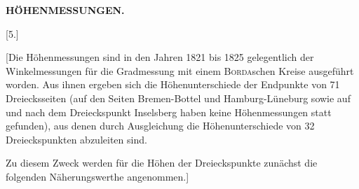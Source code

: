 \par\clearpage
\noindent\null\hfill{\small\textbf{HÖHENMESSUNGEN.}}\hfill{}\par\medskip
\begin{center}
[5.]\par{}
\end{center}
\par\noindent\hspace*{\parindent}[Die Höhenmessungen sind in den Jahren 1821 bis 1825 gelegentlich der
Winkelmessungen für die Gradmessung mit einem \textsc{Borda}schen Kreise ausgeführt worden.
Aus ihnen ergeben sich die Höhenunterschiede der Endpunkte von 71 Dreiecksseiten
(auf den Seiten Bremen-Bottel und Hamburg-Lüneburg sowie auf und nach dem Dreieckspunkt
Inselsberg haben keine Höhenmessungen statt gefunden), aus denen durch Ausgleichung
die Höhenunterschiede von 32 Dreieckspunkten abzuleiten sind.
\par\noindent\hspace*{\parindent}Zu diesem Zweck werden für die Höhen der Dreieckspunkte zunächst die
folgenden Näherungswerthe angenommen.]
\par\medskip
